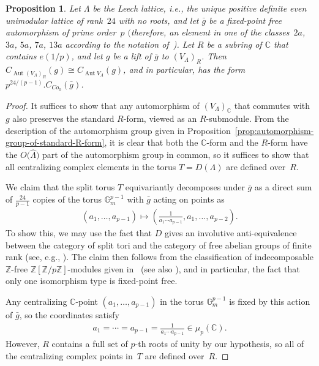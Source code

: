 \documentclass[pdftex]{sigma}
\newcommand{\bC}{\mathbb{C}}
\newcommand{\bG}{\mathbb{G}}
\newcommand{\bZ}{\mathbb{Z}}
\DeclareMathOperator{\Aut}{Aut}
\newtheorem{prop}[thm]{Proposition}
\theoremstyle{definition}
\begin{document}
\begin{prop} \label{prop:centralizers-for-Leech}
Let $\Lambda$ be the Leech lattice, i.e., the unique positive definite even uni\-mo\-dular lattice of rank~$24$ with no roots, and let $\bar{g}$ be a fixed-point free automorphism of prime order~$p$ $($therefore, an element in one of the classes~$2a$, $3a$, $5a$, $7a$, $13a$ according to the notation of~{\rm \cite{GAP})}. Let $R$ be a subring of $\bC$ that contains $e(1/p)$, and let $g$ be a lift of $\bar{g}$ to $(V_\Lambda)_R$. Then $C_{\Aut (V_\Lambda)_R}(g) \cong C_{\Aut V_\Lambda}(g)$, and in particular, has the form $p^{24/(p-1)}.C_{Co_0}(\bar{g})$.
\end{prop}
\begin{proof}It suffices to show that any automorphism of $(V_\Lambda)_\bC$ that commutes with $g$ also preserves the standard $R$-form, viewed as an $R$-submodule. From the description of the automorphism group given in Proposition~\ref{prop:automorphism-group-of-standard-R-form}, it is clear that both the $\bC$-form and the $R$-form have the $O\big(\hat{\Lambda}\big)$ part of the automorphism group in common, so it suffices to show that all centralizing complex elements in the torus $T = D(\Lambda)$ are defined over~$R$.

We claim that the split torus $T$ equivariantly decomposes under $\bar{g}$ as a direct sum of $\frac{24}{p-1}$ copies of the torus $\bG_m^{p-1}$ with $\bar{g}$ acting on points as
\begin{gather*} (a_1, \ldots ,a_{p-1}) \mapsto \left(\frac{1}{a_1\cdots a_{p-1}},a_1,\ldots,a_{p-2}\right). \end{gather*}
To show this, we may use the fact that $D$ gives an involutive anti-equivalence between the category of split tori and the category of free abelian groups of finite rank (see, e.g., \cite[Expos\'e~VIII, Section~1]{SGA3}). The claim then follows from the classification of indecomposable $\bZ$-free $\bZ[\bZ/p\bZ]$-modules given in~\cite{D38} (see also \cite[Theorem~74.3]{CR62}), and in particular, the fact that only one isomorphism type is fixed-point free.

Any centralizing $\bC$-point $(a_1, \ldots, a_{p-1})$ in the torus $\bG_m^{p-1}$ is fixed by this action of $\bar{g}$, so the coordinates satisfy
\begin{gather*} a_1=\cdots = a_{p-1} = \frac{1}{a_1\cdots a_{p-1}} \in \mu_p(\bC). \end{gather*}
However, $R$ contains a full set of $p$-th roots of unity by our hypothesis, so all of the centralizing complex points in~$T$ are defined over~$R$.
\end{proof}
\end{document}
